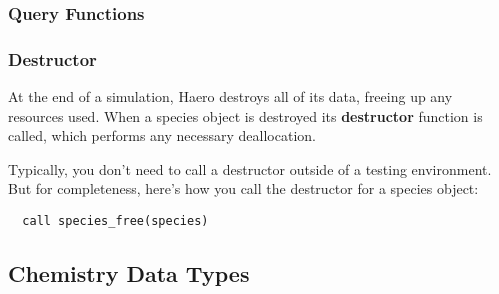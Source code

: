 \subsubsection*{Query Functions}

\subsubsection*{Destructor}

At the end of a simulation, Haero destroys all of its data, freeing up any
resources used. When a species object is destroyed its {\bf destructor }
function is called, which performs any necessary deallocation.

Typically, you don't need to call a destructor outside of a testing environment.
But for completeness, here's how you call the destructor for a species object:

\begin{verbatim}
  call species_free(species)
\end{verbatim}

\subsection{Chemistry Data Types}

